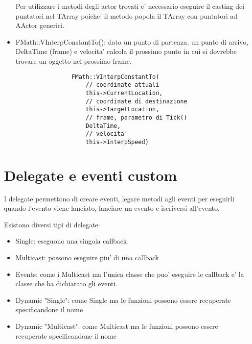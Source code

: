 \begin{itemize}
                \begin{notebox}
                    Per utilizzare i metodi degli actor trovati e' necessario eseguire il casting dei puntatori nel TArray
                    poiche' il metodo popola il TArray con puntatori ad AActor generici.
                \end{notebox}

            \item FMath::VInterpConstantTo(): dato un punto di partenza, un punto di arrivo, DeltaTime (frame) e velocita' calcola il prossimo punto in cui si dovrebbe trovare un oggetto nel prossimo frame.

            \begin{verbatim}
                FMath::VInterpConstantTo(
                    // coordinate attuali
                    this->CurrentLocation,
                    // coordinate di destinazione
                    this->TargetLocation,
                    // frame, parametro di Tick()
                    DeltaTime,
                    // velocita'
                    this->InterpSpeed)
            \end{verbatim}

        \end{itemize}

    \section{Delegate e eventi custom}

        I delegate permettono di creare eventi, legare metodi agli eventi per eseguirli quando l'evento viene lanciato, lanciare un evento e iscriversi all'evento.

        Esistono diversi tipi di delegate:
        \begin{itemize}
            \item Single: eseguono una singola callback
            \item Multicast: possono eseguire piu' di una callback
            \item Events: come i Multicast ma l'unica classe che puo' eseguire le callback e' la classe che ha dichiarato gli eventi.
            \item Dynamic "Single": come Single ma le funzioni possono essere recuperate specificandone il nome
            \item Dynamic "Multicast": come Multicast ma le funzioni possono essere recuperate specificandone il nome
        \end{itemize}

